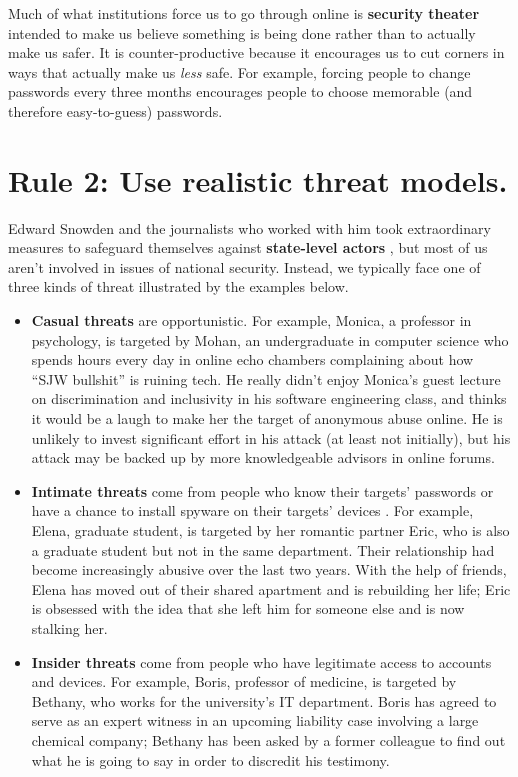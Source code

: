 \documentclass[10pt,letterpaper]{article}
\newcommand{\rulemajor}[1]{\section*{#1}}
\begin{document}
Much of what institutions force us to go through online is \textbf{security theater}
intended to make us believe something is being done
rather than to actually make us safer.
It is counter-productive because it encourages us to cut corners
in ways that actually make us \emph{less} safe.
For example,
forcing people to change passwords every three months
encourages people to choose memorable (and therefore easy-to-guess) passwords.

\rulemajor{Rule 2: Use realistic threat models.}

Edward Snowden and the journalists who worked with him took extraordinary measures
to safeguard themselves against \textbf{state-level actors} \cite{Snow2019},
but most of us aren't involved in issues of national security.
Instead,
we typically face one of three kinds of threat illustrated by the examples below.

\begin{itemize}

\item
  \textbf{Casual threats} are opportunistic.
  For example,
  Monica, a professor in psychology, is targeted by Mohan,
  an undergraduate in computer science
  who spends hours every day in online echo chambers complaining about how ``SJW bullshit'' is ruining tech.
  He really didn't enjoy Monica's guest lecture on discrimination and inclusivity in his software engineering class,
  and thinks it would be a laugh to make her the target of anonymous abuse online.
  He is unlikely to invest significant effort in his attack (at least not initially),
  but his attack may be backed up by more knowledgeable advisors in online forums.

\item
  \textbf{Intimate threats} come from people who know their targets' passwords
  or have a chance to install spyware on their targets' devices \cite{Leit2019}.
  For example,
  Elena, graduate student,
  is targeted by her romantic partner Eric,
  who is also a graduate student but not in the same department.
  Their relationship had become increasingly abusive over the last two years.
  With the help of friends,
  Elena has moved out of their shared apartment and is rebuilding her life;
  Eric is obsessed with the idea that she left him for someone else and is now stalking her.

\item
  \textbf{Insider threats} come from people who have legitimate access to accounts and devices.
  For example,
  Boris, professor of medicine,
  is targeted by Bethany, who works for the university's IT department.
  Boris has agreed to serve as an expert witness in an upcoming liability case involving a large chemical company;
  Bethany has been asked by a former colleague to find out what he is going to say in order to discredit his testimony.

\end{itemize}
\end{document}
